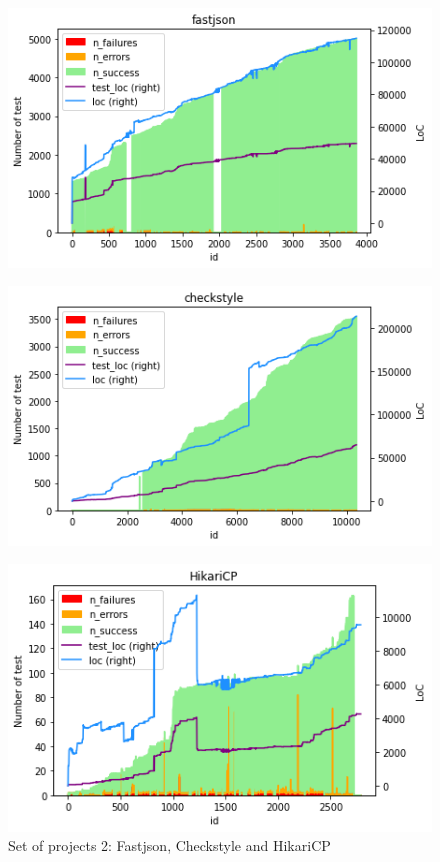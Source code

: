 \begin{figure}[!htb]
    \centering
    \caption{Set of projects 2: Fastjson, Checkstyle and HikariCP}
    \label{fig:projects-2}
    \begin{minipage}{.5\linewidth}
        \centering
        \includegraphics[width=\textwidth]{pages/02-Testability/images/projects/fastjson.png}
        \label{fig:fastjson}
    \end{minipage}%
    \begin{minipage}{.5\linewidth}
        \centering
        \includegraphics[width=\textwidth]{pages/02-Testability/images/projects/checkstyle.png}
        \label{fig:checkstyle}
    \end{minipage}
    \begin{minipage}{.5\linewidth}
        \centering
        \includegraphics[width=\textwidth]{pages/02-Testability/images/projects/hikari.png}

\end{minipage}
\end{figure}
